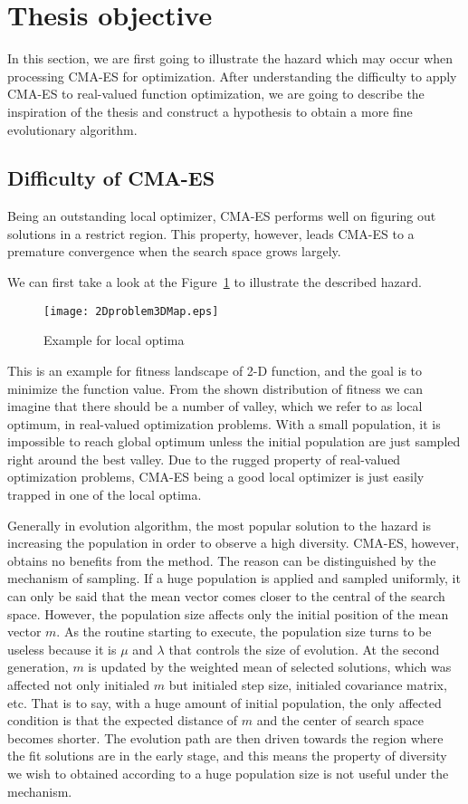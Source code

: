 \section{Thesis objective} \label{sec:motivation}

In this section, we are first going to illustrate the
hazard which may occur when processing CMA-ES for
optimization.
After understanding the difficulty to apply CMA-ES to real-valued
function optimization, we are going to describe the inspiration of the
thesis and construct a hypothesis to obtain a more fine evolutionary
algorithm.
\subsection{Difficulty of CMA-ES} Being an outstanding local optimizer,
CMA-ES performs well on figuring out solutions in a restrict region.
This property, however, leads CMA-ES to a premature convergence when the
search space grows largely. 

We can first take a look at the Figure~\ref{fig:localExample} to
illustrate the described hazard.
\begin{figure}[h] \begin{center}
    \texttt{[image: 2Dproblem3DMap.eps]}
    \caption{Example for local optima}
    \label{fig:localExample} 
  \end{center} 
\end{figure}
This is an example for fitness landscape of 2-D
function, and the goal is to minimize the function
value.  From the shown distribution of fitness we can
imagine that there should be a number of valley, which
we refer to as local optimum, in real-valued
optimization problems.  With a small population, it is
impossible to reach global optimum unless the initial
population are just sampled right around the best
valley.  Due to the rugged property of real-valued
optimization problems, CMA-ES being a good local
optimizer is just easily trapped in one of the local
optima.

  Generally in evolution algorithm, the most popular
  solution to the hazard is increasing the population
  in order to observe a high diversity.  CMA-ES,
  however, obtains no benefits from the method.  The
  reason can be distinguished by the mechanism of
sampling.  If a huge population is applied and
sampled uniformly, it can only be said that the mean
vector comes closer to the central of the search
space.  However, the population size affects only
the initial position of the mean vector $m$.  As the
routine starting to execute, the population size
turns to be useless because it is $\mu$ and
$\lambda$ that controls the size of evolution.  At
the second generation, $m$ is updated by the
weighted mean of selected solutions, which was
affected not only initialed $m$ but initialed step
size, initialed covariance matrix, etc.  That is to
say, with a huge amount of initial population, the
only affected condition is that the expected
distance of $m$ and the center of search space
becomes shorter.  The evolution path are then driven
towards the region where the fit solutions are in
the early stage, and this means the property of
diversity we wish to obtained according to a huge
population size is not useful under the mechanism.

